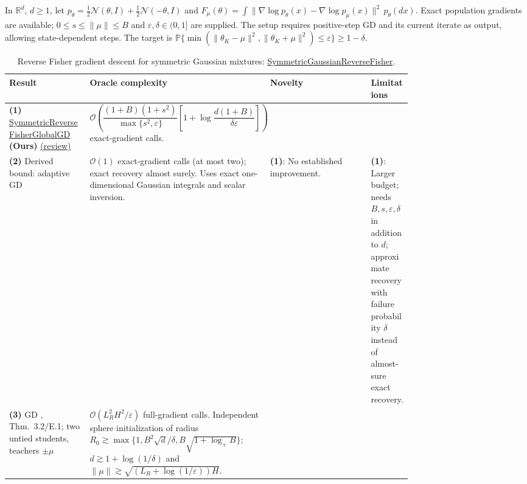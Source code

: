 \begin{table}[tp]
\centering
\caption{Reverse Fisher gradient descent for symmetric Gaussian mixtures: \href{https://github.com/k3nfalt/longtails/blob/main/LongTails/Setups/SymmetricGaussianReverseFisher.lean}{SymmetricGaussianReverseFisher}.}\label{tab:SymmetricGaussianReverseFisher}
\parbox{\linewidth}{\footnotesize In $\mathbb{R}^d$, $d\ge1$, let $p_\theta=\tfrac12\mathcal N(\theta,I)+\tfrac12\mathcal N(-\theta,I)$ and $F_\mu(\theta)=\int\|\nabla\log p_\theta(x)-\nabla\log p_\mu(x)\|^2\,p_\theta(dx)$. Exact population gradients are available; $0\le s\le\|\mu\|\le B$ and $\varepsilon,\delta\in(0,1]$ are supplied. The setup requires positive-step GD and its current iterate as output, allowing state-dependent steps. The target is $\mathbb P\{\min(\|\theta_K-\mu\|^2,\|\theta_K+\mu\|^2)\le\varepsilon\}\ge1-\delta$.}\par\smallskip
\begin{threeparttable}
\footnotesize
\setlength{\tabcolsep}{4pt}\renewcommand{\arraystretch}{1.25}
\begin{tabularx}{\linewidth}{@{}>{\raggedright\arraybackslash}p{0.20\linewidth}>{\raggedright\arraybackslash}p{0.32\linewidth}>{\raggedright\arraybackslash}p{0.25\linewidth}>{\raggedright\arraybackslash}X@{}}
\toprule
\textbf{Result} & \textbf{Oracle complexity} & \textbf{Novelty} & \textbf{Limitations} \\
\midrule
\textbf{(1)} \href{https://github.com/k3nfalt/longtails/blob/main/LongTails/Theorems/SymmetricReverseFisherGlobalGD.lean}{Symmetric\allowbreak Reverse\allowbreak Fisher\allowbreak Global\allowbreak GD} \textbf{(Ours)} \href{https://github.com/k3nfalt/longtails/blob/main/scripts/reviews/SymmetricReverseFisherGlobalGD.md}{(review)}
& $\mathcal{O}\!\left(\dfrac{(1+B)(1+s^2)}{\max\{s^2,\varepsilon\}}\left[1+\log\dfrac{d(1+B)}{\delta\varepsilon}\right]\right)$ exact-gradient calls. & & \\
\midrule[1.2pt]
\textbf{(2)} Derived bound: adaptive GD
& $\mathcal{O}(1)$ exact-gradient calls (at most two); exact recovery almost surely. Uses exact one-dimensional Gaussian integrals and scalar inversion.
& \textbf{(1)}: No established improvement.
& \textbf{(1)}: Larger budget; needs $B,s,\varepsilon,\delta$ in addition to $d$; approximate recovery with failure probability $\delta$ instead of almost-sure exact recovery. \\
\midrule
\textbf{(3)} GD \citep{srfTyurin2026v1}, Thm.~3.2/E.1; two untied students, teachers $\pm\mu$
& $\mathcal{O}(L_R^2H^2/\varepsilon)$ full-gradient calls. Independent sphere initialization of radius $R_0\gtrsim\max\{1,B^2\sqrt d/\delta,B\sqrt{1+\log_+B}\}$; $d\gtrsim1+\log(1/\delta)$ and $\|\mu\|\gtrsim\sqrt{(L_R+\log(1/\varepsilon))H}$.

\end{tabularx}
\end{threeparttable}
\end{table}
